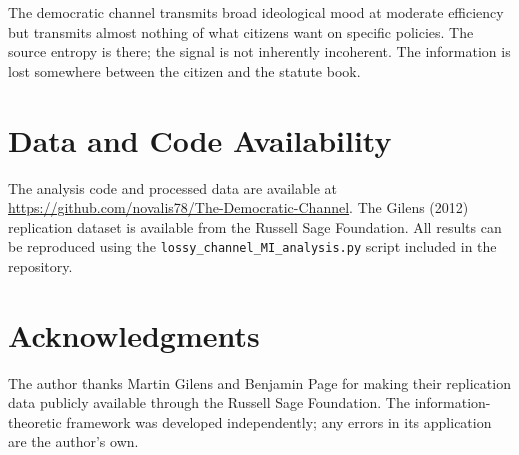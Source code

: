 \documentclass[twocolumn,10pt]{article}
\begin{document}
The democratic channel transmits broad ideological mood at moderate efficiency but transmits almost nothing of what citizens want on specific policies.  The source entropy is there; the signal is not inherently incoherent.  The information is lost somewhere between the citizen and the statute book.

\section*{Data and Code Availability}

The analysis code and processed data are available at \url{https://github.com/novalis78/The-Democratic-Channel}.  The Gilens (2012) replication dataset is available from the Russell Sage Foundation.  All results can be reproduced using the \texttt{lossy\_channel\_MI\_analysis.py} script included in the repository.

\section*{Acknowledgments}

The author thanks Martin Gilens and Benjamin Page for making their replication data publicly available through the Russell Sage Foundation.  The information-theoretic framework was developed independently; any errors in its application are the author's own.
\end{document}
